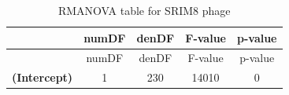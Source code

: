 \documentclass[]{article}
\begin{document}
\begin{longtable}[]{@{}ccccc@{}}
\caption{RMANOVA table for SRIM8 phage}\tabularnewline
\toprule
\begin{minipage}[b]{0.21\columnwidth}\centering\strut
~
\strut\end{minipage} &
\begin{minipage}[b]{0.10\columnwidth}\centering\strut
numDF
\strut\end{minipage} &
\begin{minipage}[b]{0.10\columnwidth}\centering\strut
denDF
\strut\end{minipage} &
\begin{minipage}[b]{0.12\columnwidth}\centering\strut
F-value
\strut\end{minipage} &
\begin{minipage}[b]{0.12\columnwidth}\centering\strut
p-value
\strut\end{minipage}\tabularnewline
\midrule
\endfirsthead
\toprule
\begin{minipage}[b]{0.21\columnwidth}\centering\strut
~
\strut\end{minipage} &
\begin{minipage}[b]{0.10\columnwidth}\centering\strut
numDF
\strut\end{minipage} &
\begin{minipage}[b]{0.10\columnwidth}\centering\strut
denDF
\strut\end{minipage} &
\begin{minipage}[b]{0.12\columnwidth}\centering\strut
F-value
\strut\end{minipage} &
\begin{minipage}[b]{0.12\columnwidth}\centering\strut
p-value
\strut\end{minipage}\tabularnewline
\midrule
\endhead
\begin{minipage}[t]{0.21\columnwidth}\centering\strut
\textbf{(Intercept)}
\strut\end{minipage} &
\begin{minipage}[t]{0.10\columnwidth}\centering\strut
1
\strut\end{minipage} &
\begin{minipage}[t]{0.10\columnwidth}\centering\strut
230
\strut\end{minipage} &
\begin{minipage}[t]{0.12\columnwidth}\centering\strut
14010
\strut\end{minipage} &
\begin{minipage}[t]{0.12\columnwidth}\centering\strut
0

\end{minipage}
\end{longtable}
\end{document}
